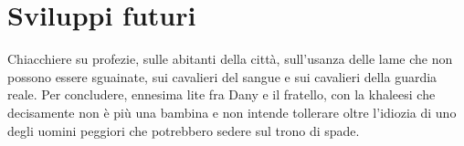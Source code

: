 \chapter{Sviluppi futuri}

Chiacchiere su profezie, sulle abitanti della città, sull’usanza delle lame che non possono essere sguainate, sui cavalieri del sangue e sui cavalieri della guardia reale. Per concludere, ennesima lite fra Dany e il fratello, con la khaleesi che decisamente non è più una bambina e non intende tollerare oltre l’idiozia di uno degli uomini peggiori che potrebbero sedere sul trono di spade.
